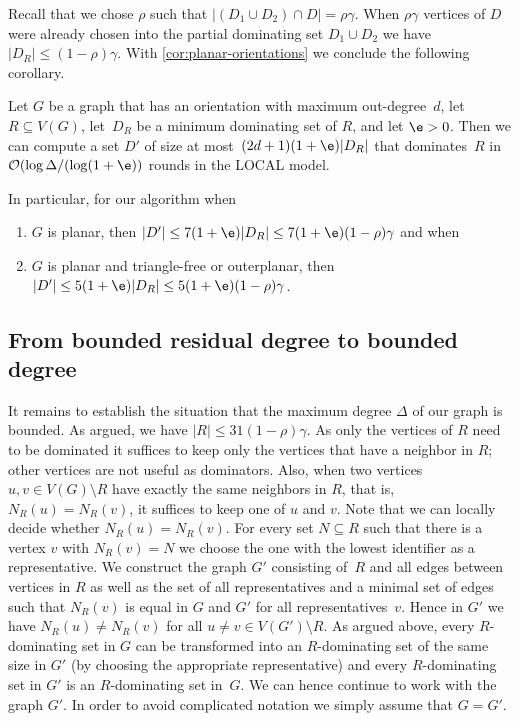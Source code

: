 \smallskip
Recall that we chose $\rho$ such that $|(D_1 \cup D_2)\cap D| =\rho\gamma$.
When $\rho\gamma$ vertices of $D$ were already chosen into
the partial dominating set $D_1\cup D_2$ we have $|D_R|\leq (1-\rho)\gamma$.
With \cref{cor:planar-orientations} we conclude the following corollary.

\begin{cor}\label{cor:LP-approx}
Let $G$ be a graph that has an orientation with maximum out-degree~$d$, let $R\subseteq V(G)$, let~$D_R$ be a
minimum dominating set of $R$, and let $\e>0$. Then we can
compute a set $D'$ of size at most~$(2d+1)(1+\e)|D_R|$ that dominates~$R$ in $\Oof(\log \Delta/(\log (1+\e))$ rounds in the LOCAL
model.

\vspace{1mm}
In particular, for our algorithm when

\vspace{-2mm}
\begin{enumerate}
\item $G$ is planar, then $|D'|\leq 7(1+\e)|D_R|
  \leq 7(1+\e)(1-\rho)\gamma$ and when \smallskip
\item $G$ is planar and triangle-free or outerplanar, then
  $|D'|\leq 5(1+\e)|D_R|\leq 5(1+\e)(1-\rho)\gamma$.
\end{enumerate}
\end{cor}

\subsection{From bounded residual degree to bounded degree}

It remains to establish the situation that the maximum degree $\Delta$
of our graph is bounded. As argued, we have $|R|\leq 31(1-\rho)\gamma$.
As only
the vertices of $R$ need to be
dominated it suffices to keep only the vertices that have a
neighbor in $R$; other vertices are not useful as dominators.
Also, when two vertices $u,v\in V(G)\setminus R$ have exactly
the same neighbors in $R$, that is, $N_R(u)=N_R(v)$,
it suffices to keep one of $u$ and $v$.
Note that we can locally decide whether $N_R(u)=N_R(v)$.
For every set $N\subseteq R$ such that there is a vertex $v$
with $N_R(v)=N$ we choose the one with the lowest identifier
as a representative. We construct the graph $G'$ consisting
of~$R$ and all edges between vertices in $R$ as well as the
set of all representatives and a minimal set of edges such that
$N_R(v)$ is equal in $G$ and $G'$ for all representatives~$v$.
Hence in $G'$ we have $N_R(u)\neq N_R(v)$ for all $u\neq v\in V(G')\setminus R$.
As argued above, every $R$-dominating set in $G$ can
be transformed into an $R$-dominating set of the same size
in $G'$ (by choosing the appropriate representative) and
every $R$-dominating set in $G'$ is an $R$-dominating set in~$G$.
We can hence continue to work with the graph $G'$. In order to
avoid complicated notation we simply assume that $G=G'$.

